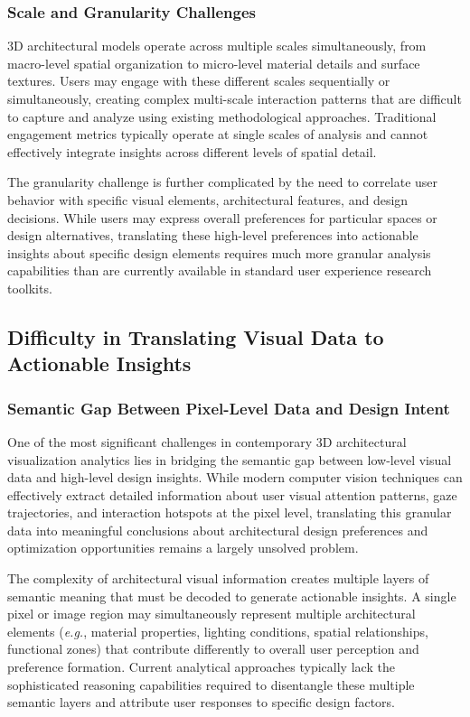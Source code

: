 \subsubsection{Scale and Granularity Challenges}
\label{subsubsec:scale_granularity}

3D architectural models operate across multiple scales simultaneously, from macro-level spatial organization to micro-level material details and surface textures. Users may engage with these different scales sequentially or simultaneously, creating complex multi-scale interaction patterns that are difficult to capture and analyze using existing methodological approaches. Traditional engagement metrics typically operate at single scales of analysis and cannot effectively integrate insights across different levels of spatial detail.

The granularity challenge is further complicated by the need to correlate user behavior with specific visual elements, architectural features, and design decisions. While users may express overall preferences for particular spaces or design alternatives, translating these high-level preferences into actionable insights about specific design elements requires much more granular analysis capabilities than are currently available in standard user experience research toolkits.

\subsection{Difficulty in Translating Visual Data to Actionable Insights}
\label{subsec:visual_data_translation}

\subsubsection{Semantic Gap Between Pixel-Level Data and Design Intent}
\label{subsubsec:semantic_gap}

One of the most significant challenges in contemporary 3D architectural visualization analytics lies in bridging the semantic gap between low-level visual data and high-level design insights. While modern computer vision techniques can effectively extract detailed information about user visual attention patterns, gaze trajectories, and interaction hotspots at the pixel level, translating this granular data into meaningful conclusions about architectural design preferences and optimization opportunities remains a largely unsolved problem.

The complexity of architectural visual information creates multiple layers of semantic meaning that must be decoded to generate actionable insights. A single pixel or image region may simultaneously represent multiple architectural elements (\textit{e.g.}, material properties, lighting conditions, spatial relationships, functional zones) that contribute differently to overall user perception and preference formation. Current analytical approaches typically lack the sophisticated reasoning capabilities required to disentangle these multiple semantic layers and attribute user responses to specific design factors.

